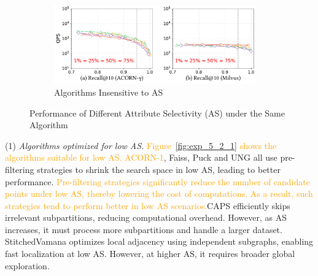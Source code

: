 \documentclass[sigconf, nonacm]{acmart}
\begin{document}
{\begin{figure}
\begin{subfigure}{0.33\textwidth}
			\includegraphics[width=0.96\textwidth]{figures/exp/exp_5_2_3.pdf}
			\caption{Algorithms Insensitive to AS}
			\label{fig:exp_5_2_3}
		\end{subfigure}
		
		
		\caption{Performance of Different Attribute Selectivity (AS) under the Same Algorithm}
		\label{fig:exp_5_2_combined}
	\end{figure}
	
	
	
	
	(1) \textit{Algorithms optimized for low AS.}  
	\textcolor{orange}{Figure~\ref{fig:exp_5_2_1} shows the algorithms suitable for low AS.}
	\textcolor{orange}{ACORN-1}, Faiss, Puck and UNG all use pre-filtering strategies to shrink the search space in low AS, leading to better performance. \textcolor{orange}{Pre-filtering strategies significantly reduce the number of candidate points under low AS, thereby lowering the cost of  computations. As a result, such strategies tend to perform better in low AS scenarios.}CAPS efficiently skips irrelevant subpartitions, reducing computational overhead. However, as AS increases, it must process more subpartitions and handle a larger dataset. StitchedVamana optimizes local adjacency using independent subgraphs, enabling fast localization at low AS. However, at higher AS, it requires broader global exploration. 
	
	
	
}
\end{document}
